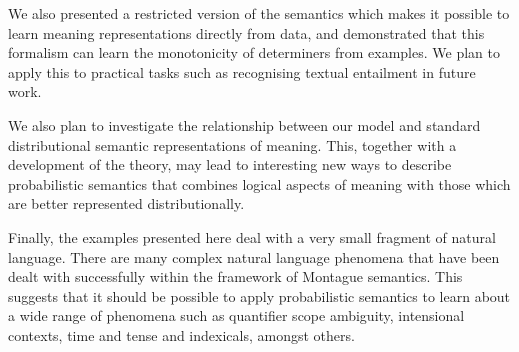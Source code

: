 \documentclass{svmult}
\begin{document}
We also presented a restricted version of the semantics which makes it
possible to learn meaning representations directly from data, and
demonstrated that this formalism can learn the monotonicity of
determiners from examples. We plan to apply this to practical tasks
such as recognising textual entailment in future work.

We also plan to investigate the relationship between our model and
standard distributional semantic representations of meaning. This,
together with a development of the theory, may lead to interesting
new ways to describe probabilistic semantics that combines logical
aspects of meaning with those which are better represented
distributionally.

Finally, the examples presented here deal with a very small fragment
of natural language. There are many complex natural language phenomena
that have been dealt with successfully within the framework of
Montague semantics. This suggests that it should be possible to apply
probabilistic semantics to learn about a wide range of phenomena such
as quantifier scope ambiguity, intensional contexts, time and tense
and indexicals, amongst others.





\end{document}
